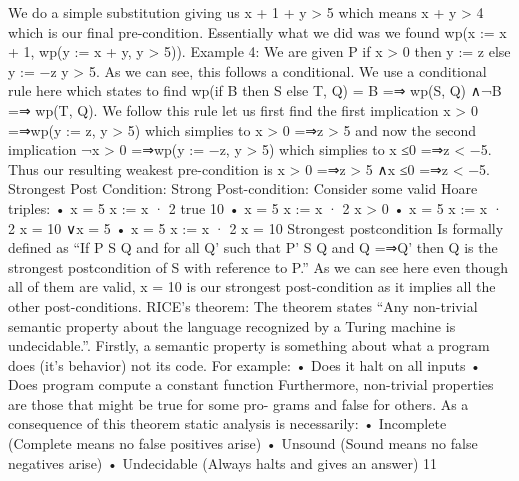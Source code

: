\documentclass[10pt]{article}
\begin{document}
\begin{multicols}{2}
We do a simple substitution giving us x + 1 + y > 5 which means x + y > 4
which is our final pre-condition. Essentially what we did was we found wp(x :=
x + 1, wp(y := x + y, y > 5)).
Example 4:
We are given {P} if
x > 0
then
y := z
else
y := −z {y > 5}. As we
can see, this follows a conditional. We use a conditional rule here which states
to find wp(if B then S else T, Q) = B
=⇒
wp(S, Q) ∧¬B
=⇒
wp(T, Q).
We follow this rule let us first find the first implication x > 0 =⇒wp(y :=
z, y > 5) which simplies to x > 0 =⇒z > 5 and now the second implication
¬x > 0 =⇒wp(y := −z, y > 5) which simplies to x ≤0 =⇒z < −5. Thus
our resulting weakest pre-condition is x > 0 =⇒z > 5 ∧x ≤0 =⇒z < −5.
Strongest Post Condition:
Strong Post-condition:
Consider some valid Hoare triples:
• {x = 5} x := x · 2 {true}
10
• {x = 5} x := x · 2 {x > 0}
• {x = 5} x := x · 2 {x = 10 ∨x = 5}
• {x = 5} x := x · 2 {x = 10}
Strongest postcondition Is formally defined as “If {P} S {Q} and for all Q’
such that {P’} S {Q} and Q =⇒Q’ then Q is the strongest postcondition of
S with reference to P.” As we can see here even though all of them are valid,
x = 10 is our strongest post-condition as it implies all the other post-conditions.
RICE’s theorem:
The theorem states “Any non-trivial semantic property about the language
recognized by a Turing machine is undecidable.”. Firstly, a semantic property is
something about what a program does (it’s behavior) not its code. For example:
• Does it halt on all inputs
• Does program compute a constant function
Furthermore, non-trivial properties are those that might be true for some pro-
grams and false for others. As a consequence of this theorem static analysis is
necessarily:
• Incomplete (Complete means no false positives arise)
• Unsound (Sound means no false negatives arise)
• Undecidable (Always halts and gives an answer)
11

\end{multicols}
\end{document}

